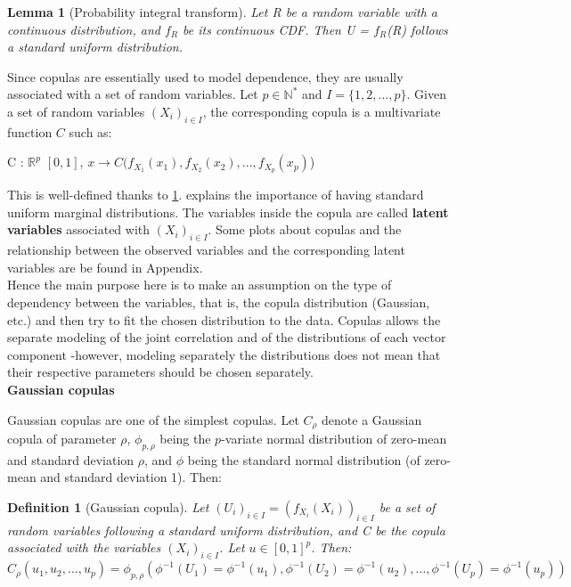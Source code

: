 \documentclass{report}
\newtheorem{lemma}{Lemma}[section]
\newtheorem{definition}{Definition}[section]
\begin{document}
\begin{lemma}[Probability integral transform]\label{cdfvariable}{Let R be a random variable with a continuous distribution, and $f_R$ be its continuous CDF. Then U = $f_R$(R) follows a standard uniform distribution.}\end{lemma}

Since copulas are essentially used to model dependence,  they are usually associated with a set of random variables. Let $p \in \mathbb{N^*}$ and $I = \{1, 2, ..., p\}$. Given a set of random variables $(X_i)_{i \in I}$, the corresponding copula is a multivariate function $C$ such as:

\begin{center}
C : $\mathbb{R}^p$ \rightarrow $[0,1]$, $x \rightarrow C(f_{X_1}(x_1), f_{X_2}(x_2), ... , f_{X_p}(x_p)$)
\end{center}

This is well-defined thanks to \ref{cdfvariable}. \cite{unifmarginals} explains the importance of having standard uniform marginal distributions. The variables inside the copula are called \textbf{latent variables} associated with $(X_i)_{i \in I}$. Some plots about copulas and the relationship between the observed variables and the corresponding latent variables are be found in Appendix.\\

Hence the main purpose here is to make an assumption on the type of dependency between the variables, that is, the copula distribution (Gaussian, etc.) and then try to fit the chosen distribution to the data\cite{bedoui2008copules}. Copulas allows the separate modeling of the joint correlation and of the distributions of each vector component -however, modeling separately the distributions does not mean that their respective parameters should be chosen separately\cite{modelmarginaldependenceseparate}.\\

\bigskip
\noindent \textbf{Gaussian copulas}
\bigskip

Gaussian copulas are one of the simplest copulas. Let $C_{\rho}$ denote a Gaussian copula of parameter $\rho$, $\phi_{p, \rho}$ being the $p$-variate normal distribution of zero-mean and standard deviation $\rho$, and $\phi$ being the standard normal distribution (of zero-mean and standard deviation 1). Then:

\begin{definition}[Gaussian copula]\label{gaussiancopula}{Let $(U_i)_{i \in I} = (f_{X_i}(X_i))_{i \in I}$ be a set of random variables following a standard uniform distribution, and C be the copula associated with the variables $(X_i)_{i \in I}$. Let $u \in [0,1]^p$. Then:\\$C_{\rho}(u_1, u_2, ..., u_p) = \phi_{p, \rho}(\phi^{-1}(U_1) = \phi^{-1}(u_1), \phi^{-1}(U_2) = \phi^{-1}(u_2), ..., \phi^{-1}(U_p) = \phi^{-1}(u_p))$}\end{definition}
\end{document}

